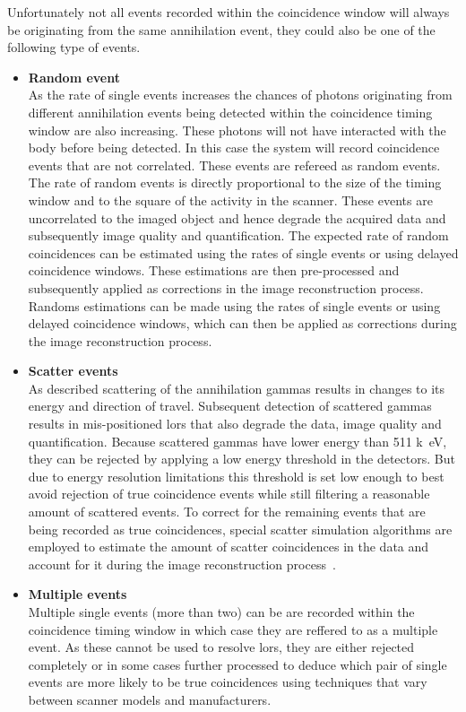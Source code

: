 %
Unfortunately not all events recorded within the coincidence window will always be originating from the same annihilation event, they could also be one of the following type of events. 
%
\begin{itemize}
\item\textbf{Random event}\\
As the rate of single events increases the chances of photons originating from different annihilation events being detected within the coincidence timing window are also increasing. These photons will not have interacted with the body before being detected.
In this case the system will record coincidence events that are not correlated. These events are refereed as random events. 
The rate of random events is directly proportional to the size of the timing window and to the square of the activity in the scanner. These events are uncorrelated to the imaged object and hence degrade the acquired data and subsequently image quality and quantification.  
The expected rate of random coincidences can be estimated using the rates of single events or using delayed coincidence windows. These estimations are then pre-processed and subsequently applied as corrections in the image reconstruction process. 
Randoms estimations can be made using the rates of single events or using delayed coincidence windows, which can then be applied as corrections during the image reconstruction process. 
%
%
\item\textbf{Scatter events}\\
As described scattering of the annihilation gammas results in changes to its energy and direction of travel. Subsequent detection of scattered gammas results in mis-positioned \glspl{lor} that also degrade the data, image quality and quantification. 
Because scattered gammas have lower energy than 511 \si{k\electronvolt}, they can be rejected by applying a low energy threshold in the detectors. But due to energy resolution limitations this threshold is set low enough to best avoid rejection of true coincidence events while still filtering a reasonable amount of scattered events.
To correct for the remaining events that are being recorded as true coincidences, special scatter simulation algorithms are employed to estimate the amount of scatter coincidences in the data and account for it during the image reconstruction process~\cite{Watson1996,Polycarpou2011}.

\item\textbf{Multiple events}\\
Multiple single events (more than two) can be are recorded within the coincidence timing window in which case they are reffered to as a multiple event. As these cannot be used to resolve \glspl{lor}, they are either rejected completely or in some cases further processed to deduce which pair of single events are more likely to  be true coincidences using techniques that vary between scanner models and manufacturers. 


\end{itemize}
